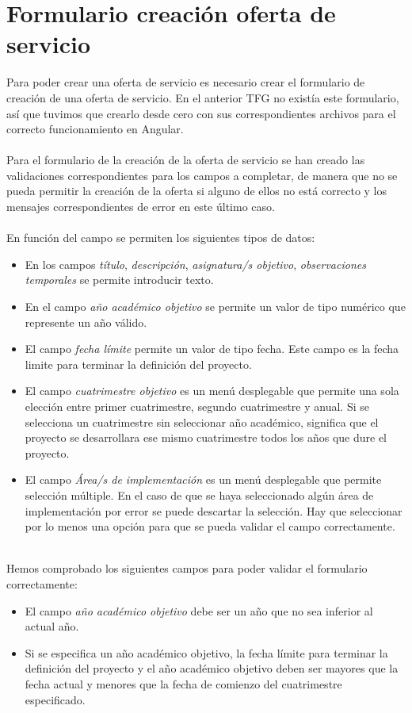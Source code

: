 \documentclass[11pt]{book}
\begin{document}
 \section{Formulario creación oferta de servicio}
 Para poder crear una oferta de servicio es necesario crear el formulario de creación de una oferta de servicio. En el anterior TFG no existía este formulario, así que tuvimos que crearlo desde cero con sus correspondientes archivos para el correcto funcionamiento en Angular.\\\\
 Para el formulario de la creación de la oferta de servicio se han creado las validaciones correspondientes para los campos a completar, de manera que no se pueda permitir la creación de la oferta si alguno de ellos no está correcto y los mensajes correspondientes de error en este último caso. \\\\
 En función del campo se permiten los siguientes tipos de datos: \\
 \begin{itemize} 
 	\item En los campos \emph{título}, \emph{descripción}, \emph{asignatura/s objetivo}, \emph{observaciones temporales} se permite introducir texto.
 	\item En el campo \emph{año académico objetivo} se permite un valor de tipo numérico que represente un año válido.
 	\item El campo \emph{fecha límite} permite un valor de tipo fecha. Este campo es la fecha limite para terminar la definición del proyecto.
 	\item  El campo \emph{cuatrimestre objetivo} es un menú desplegable que permite una sola elección entre primer cuatrimestre, segundo cuatrimestre y anual. Si se selecciona un cuatrimestre sin seleccionar año académico, significa que el proyecto se desarrollara ese mismo cuatrimestre todos los años que dure el proyecto.
 	\item El campo \emph{Área/s de implementación} es un menú desplegable que permite selección múltiple. En el caso de que se haya seleccionado algún área de implementación por error se puede descartar la selección. Hay que seleccionar por lo menos una opción para que se pueda validar el campo correctamente.\\\\
 \end{itemize}
 Hemos comprobado los siguientes campos para poder validar el formulario correctamente:
 \begin{itemize} 
 	\item	El campo \emph{año académico objetivo} debe ser un año que no sea inferior al actual año.
 	\item	Si se especifica un año académico objetivo, la fecha límite para terminar la definición del proyecto y el año académico objetivo deben ser mayores que la fecha actual y menores que la fecha de comienzo del cuatrimestre especificado.\\\\
 \end{itemize}
\end{document}
